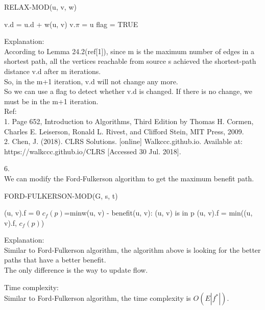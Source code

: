 \documentclass{article}
\begin{document}
\begin{algorithm}[H]
	\caption{RELAX-MOD(u, v, w)}
	{
		v.d = u.d + w(u, v)\;
		v.$\pi$ = u\;
		flag = TRUE\;
	}
\end{algorithm}
Explanation:\\
According to Lemma 24.2(ref[1]), since m is the maximum number of edges in a shortest path, all the vertices reachable from source s 
achieved the shortest-path distance v.d after m iterations.\\
So, in the m+1 iteration, v.d will not change any more.\\
So we can use a flag to detect whether v.d is changed. If there is no change, we must be in the m+1 iteration.\\

Ref:\\
1. Page 652, Introduction to Algorithms, Third Edition by Thomas H. Cormen, Charles E. Leiserson, Ronald L. Rivest, and Clifford Stein, MIT Press, 2009.\\
2. Chen, J. (2018). CLRS Solutions. [online] Walkccc.github.io. Available at: https://walkccc.github.io/CLRS [Accessed 30 Jul. 2018].

6.\\
We can modify the Ford-Fulkerson algorithm to get the maximum benefit path.\\
\begin{algorithm}[H]
	\caption{FORD-FULKERSON-MOD(G, s, t)}
	{
		(u, v).f = 0
	}
	{
		$c_f(p)$=min{w(u, v) - benefit(u, v): (u, v) is in p}\;
		{
			(u, v).f = min((u, v).f, $c_f(p)$)
		}
	}
\end{algorithm}
Explanation:\\
Similar to Ford-Fulkerson algorithm, the algorithm above is looking for the better paths that have a better benefit. \\
The only difference is the way to update flow. 

Time complexity:\\
Similar to Ford-Fulkerson algorithm, the time complexity is $O(E|f^*|)$.\\
\end{document}
